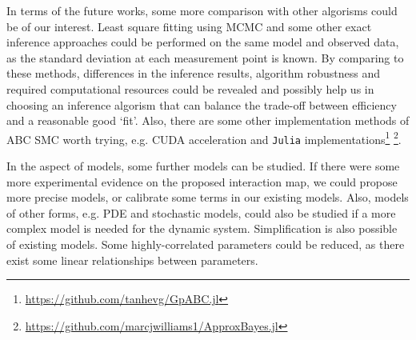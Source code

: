 In terms of the future works, some more comparison with other algorisms could be of our interest. Least square fitting using MCMC \cite{ref:MCMC} and some other exact inference approaches could be performed on the same model and observed data, as the standard deviation at each measurement point is known. By comparing to these methods, differences in the inference results, algorithm robustness and required computational resources could be revealed and possibly help us in choosing an inference algorism that can balance the trade-off between efficiency and a reasonable good `fit'. Also, there are some other implementation methods of ABC SMC worth trying, e.g. CUDA acceleration and \verb|Julia| implementations\footnote[1]{\url{https://github.com/tanhevg/GpABC.jl}} \footnote[2]{\url{https://github.com/marcjwilliams1/ApproxBayes.jl}}.

In the aspect of models, some further models can be studied. If there were some more experimental evidence on the proposed interaction map, we could propose more precise models, or calibrate some terms in our existing models. Also, models of other forms, e.g. PDE and stochastic models, could also be studied if a more complex model is needed for the dynamic system. Simplification is also possible of existing models. Some highly-correlated parameters could be reduced, as there exist some linear relationships between parameters.  

